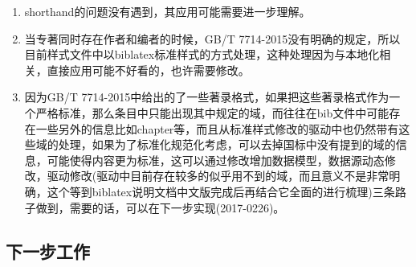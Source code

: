 \begin{enumerate}





  \item shorthand的问题没有遇到，其应用可能需要进一步理解。

  \item 当专著同时存在作者和编者的时候，GB/T 7714-2015没有明确的规定，所以目前样式文件中以biblatex标准样式的方式处理，这种处理因为与本地化相关，直接应用可能不好看的，也许需要修改。

  \item 因为GB/T 7714-2015中给出的了一些著录格式，如果把这些著录格式作为一个严格标准，那么条目中只能出现其中规定的域，而往往在bib文件中可能存在一些另外的信息比如chapter等，而且从标准样式修改的驱动中也仍然带有这些域的处理，如果为了标准化规范化考虑，可以去掉国标中没有提到的域的信息，可能使得内容更为标准，这可以通过修改增加数据模型，数据源动态修改，驱动修改(驱动中目前存在较多的似乎用不到的域，而且意义不是非常明确，这个等到biblatex说明文档中文版完成后再结合它全面的进行梳理)三条路子做到，需要的话，可以在下一步实现(2017-0226)。
\end{enumerate}

\subsection{下一步工作}

